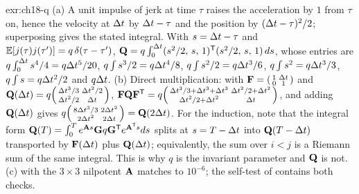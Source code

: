 \begin{solution}{exr:ch18-q}
(a) A unit impulse of jerk at time $\tau$ raises the acceleration by $1$ from $\tau$ on, hence the velocity at $\Delta t$ by $\Delta t-\tau$ and the position by $(\Delta t-\tau)^2/2$; superposing gives the stated integral. With $s=\Delta t-\tau$ and $\mathbb{E}[j(\tau)j(\tau')]=q\,\delta(\tau-\tau')$, $\mathbf{Q}=q\int_0^{\Delta t}(s^2/2,\,s,\,1)^{\mathsf{T}}(s^2/2,\,s,\,1)\,ds$, whose entries are $q\int_0^{\Delta t}s^4/4=q\Delta t^5/20$, $q\int s^3/2=q\Delta t^4/8$, $q\int s^2/2=q\Delta t^3/6$, $q\int s^2=q\Delta t^3/3$, $q\int s=q\Delta t^2/2$ and $q\Delta t$. (b) Direct multiplication: with $\mathbf{F}=\begin{psmallmatrix}1&\Delta t\\0&1\end{psmallmatrix}$ and $\mathbf{Q}(\Delta t)=q\begin{psmallmatrix}\Delta t^3/3&\Delta t^2/2\\ \Delta t^2/2&\Delta t\end{psmallmatrix}$, $\mathbf{F}\mathbf{Q}\mathbf{F}^{\mathsf{T}}=q\begin{psmallmatrix}\Delta t^3/3+\Delta t^3+\Delta t^3&\Delta t^2/2+\Delta t^2\\ \Delta t^2/2+\Delta t^2&\Delta t\end{psmallmatrix}$, and adding $\mathbf{Q}(\Delta t)$ gives $q\begin{psmallmatrix}8\Delta t^3/3&2\Delta t^2\\2\Delta t^2&2\Delta t\end{psmallmatrix}=\mathbf{Q}(2\Delta t)$. For the induction, note that the integral form $\mathbf{Q}(T)=\int_0^T e^{\mathbf{A}s}\mathbf{G}q\mathbf{G}^{\mathsf{T}} e^{\mathbf{A}^{\mathsf{T}} s}ds$ splits at $s=T-\Delta t$ into $\mathbf{Q}(T-\Delta t)$ transported by $\mathbf{F}(\Delta t)$ plus $\mathbf{Q}(\Delta t)$; equivalently, the sum over $i<j$ is a Riemann sum of the same integral. This is why $q$ is the invariant parameter and $\mathbf{Q}$ is not. (c)  with the $3\times3$ nilpotent $\mathbf{A}$ matches  to $10^{-6}$; the self-test of  contains both checks.
\end{solution}

